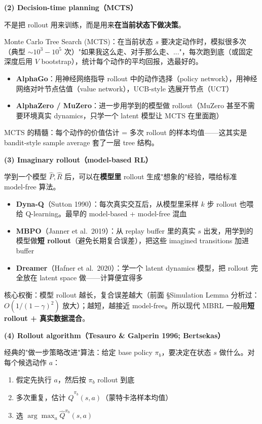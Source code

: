 \documentclass[11pt,a4paper]{article}
\theoremstyle{definition}
\begin{document}
\textbf{(2) Decision-time planning（MCTS）}

不是把 rollout 用来训练，而是用来\textbf{在当前状态下做决策}。

Monte Carlo Tree Search (MCTS)：在当前状态 $s$ 要决定动作时，模拟很多次（典型 $\sim 10^3-10^5$ 次）"如果我这么走、对手那么走、..."，每次跑到底（或固定深度后用 $V$ bootstrap），统计每个动作的平均回报，选最好的。

\begin{itemize}
\item \textbf{AlphaGo}：用神经网络指导 rollout 中的动作选择（policy network），用神经网络对叶节点估值（value network），UCB-style 选展开节点（UCT）
\item \textbf{AlphaZero / MuZero}：进一步用学到的模型做 rollout（MuZero 甚至不需要环境真实 dynamics，只学一个 latent 模型让 MCTS 在里面跑）
\end{itemize}

MCTS 的精髓：每个动作的价值估计 = 多次 rollout 的样本均值——这其实是 bandit-style sample average 套了一层 tree 结构。

\textbf{(3) Imaginary rollout（model-based RL）}

学到一个模型 $\hat P, \hat R$ 后，可以在\textbf{模型里} rollout 生成"想象的"经验，喂给标准 model-free 算法。

\begin{itemize}
\item \textbf{Dyna-Q}（Sutton 1990）：每次真实交互后，从模型里采样 $k$ 步 rollout 也喂给 Q-learning。最早的 model-based + model-free 混血
\item \textbf{MBPO}（Janner et al.\ 2019）：从 replay buffer 里的真实 $s$ 出发，用学到的模型做\textbf{短 rollout}（避免长期复合误差），把这些 imagined transitions 加进 buffer
\item \textbf{Dreamer}（Hafner et al.\ 2020）：学一个 latent dynamics 模型，把 rollout 完全放在 latent space 做——计算便宜得多
\end{itemize}

核心权衡：模型 rollout 越长，复合误差越大（前面 §Simulation Lemma 分析过：$O(1/(1-\gamma)^2)$ 放大）；越短，越接近 model-free。所以现代 MBRL 一般用\textbf{短 rollout + 真实数据混合}。

\textbf{(4) Rollout algorithm（Tesauro \& Galperin 1996; Bertsekas）}

经典的"做一步策略改进"算法：给定 base policy $\pi_b$，要决定在状态 $s$ 做什么。对每个候选动作 $a$：
\begin{enumerate}
\item 假定先执行 $a$，然后按 $\pi_b$ rollout 到底
\item 多次重复，估计 $\hat Q^{\pi_b}(s, a)$（蒙特卡洛样本均值）
\item 选 $\arg\max_a \hat Q^{\pi_b}(s, a)$
\end{enumerate}
\end{document}
